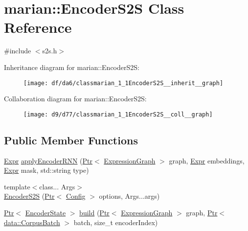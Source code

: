 \hypertarget{classmarian_1_1EncoderS2S}{}\section{marian\+:\+:Encoder\+S2S Class Reference}
\label{classmarian_1_1EncoderS2S}


{\ttfamily \#include $<$s2s.\+h$>$}



Inheritance diagram for marian\+:\+:Encoder\+S2S\+:
\nopagebreak
\begin{figure}[H]
\begin{center}
\leavevmode
\texttt{[image: df/da6/classmarian\_1\_1EncoderS2S\_\_inherit\_\_graph]}
\end{center}
\end{figure}


Collaboration diagram for marian\+:\+:Encoder\+S2S\+:
\nopagebreak
\begin{figure}[H]
\begin{center}
\leavevmode
\texttt{[image: d9/d77/classmarian\_1\_1EncoderS2S\_\_coll\_\_graph]}
\end{center}
\end{figure}
\subsection*{Public Member Functions}
\begin{DoxyCompactItemize}
\item 
\hyperlink{namespacemarian_a498d8baf75b754011078b890b39c8e12}{Expr} \hyperlink{classmarian_1_1EncoderS2S_a4c184957715cc7cfa910be04396b3f01}{apply\+Encoder\+R\+NN} (\hyperlink{namespacemarian_ad1a373be43a00ef9ce35666145137b08}{Ptr}$<$ \hyperlink{classmarian_1_1ExpressionGraph}{Expression\+Graph} $>$ graph, \hyperlink{namespacemarian_a498d8baf75b754011078b890b39c8e12}{Expr} embeddings, \hyperlink{namespacemarian_a498d8baf75b754011078b890b39c8e12}{Expr} mask, std\+::string type)
\item 
{\footnotesize template$<$class... Args$>$ }\\\hyperlink{classmarian_1_1EncoderS2S_ad9075c849041e923ca7b92f5e96fa7bd}{Encoder\+S2S} (\hyperlink{namespacemarian_ad1a373be43a00ef9ce35666145137b08}{Ptr}$<$ \hyperlink{classmarian_1_1Config}{Config} $>$ options, Args...\+args)
\item 
\hyperlink{namespacemarian_ad1a373be43a00ef9ce35666145137b08}{Ptr}$<$ \hyperlink{classmarian_1_1EncoderState}{Encoder\+State} $>$ \hyperlink{classmarian_1_1EncoderS2S_ac7066b7a2aabebd2efce08215a1c00c7}{build} (\hyperlink{namespacemarian_ad1a373be43a00ef9ce35666145137b08}{Ptr}$<$ \hyperlink{classmarian_1_1ExpressionGraph}{Expression\+Graph} $>$ graph, \hyperlink{namespacemarian_ad1a373be43a00ef9ce35666145137b08}{Ptr}$<$ \hyperlink{classmarian_1_1data_1_1CorpusBatch}{data\+::\+Corpus\+Batch} $>$ batch, size\+\_\+t encoder\+Index)
\end{DoxyCompactItemize}
